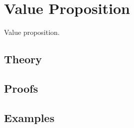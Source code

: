 
\section{Value Proposition}
\label{sec:2.6.11-value-proposition}

\begin{ticket}
Value proposition.
\end{ticket}

\subsection*{Theory}

\subsection*{Proofs}

\subsection*{Examples}
